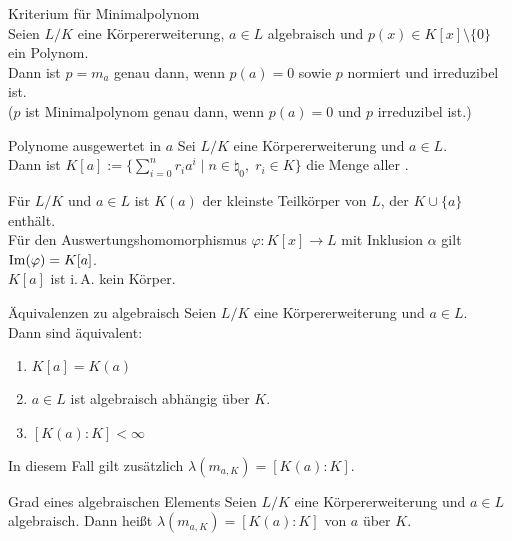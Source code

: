 \begin{Lemma}{Kriterium für Minimalpolynom}\\
    Seien $L/K$ eine Körpererweiterung, $a \in L$ algebraisch
    und $p(x) \in K[x] \setminus \{0\}$ ein Polynom.\\
    Dann ist $p = m_a$ genau dann, wenn
    $p(a) = 0$ sowie $p$ normiert und irreduzibel ist.\\
    ($p$ ist Minimalpolynom genau dann,
    wenn $p(a) = 0$ und $p$ irreduzibel ist.)
\end{Lemma}

\linie

\begin{Def}{Polynome ausgewertet in $a$}
    Sei $L/K$ eine Körpererweiterung und $a \in L$.\\
    Dann ist $K[a] := \{\sum_{i=0}^n r_i a^i \;|\;
    n \in \natural_0,\; r_i \in K\}$ die Menge aller
    .
\end{Def}

\begin{Bem}
    Für $L/K$ und $a \in L$ ist $K(a)$ der kleinste Teilkörper von $L$, der
    $K \cup \{a\}$ enthält.\\
    Für den Auswertungshomomorphismus $\varphi\colon K[x] \rightarrow L$
    mit Inklusion $\alpha$ gilt $\operatorname{Im}(\varphi) = K[a]$.\\
    $K[a]$ ist i.\,A. kein Körper.
\end{Bem}

\begin{Prop}{Äquivalenzen zu algebraisch}
    Seien $L/K$ eine Körpererweiterung und $a \in L$.\\
    Dann sind äquivalent:
    \begin{enumerate}[label=(\alph*)]
        \item
        $K[a] = K(a)$

        \item
        $a \in L$ ist algebraisch abhängig über $K$.

        \item
        $[K(a) : K] < \infty$
    \end{enumerate}
    In diesem Fall gilt zusätzlich $\lambda(m_{a,K}) = [K(a) : K]$.
\end{Prop}

\begin{Def}{Grad eines algebraischen Elements}
    Seien $L/K$ eine Körpererweiterung und $a \in L$ algebraisch.
    Dann heißt $\lambda(m_{a,K}) = [K(a) : K]$  von $a$ über $K$.
\end{Def}

